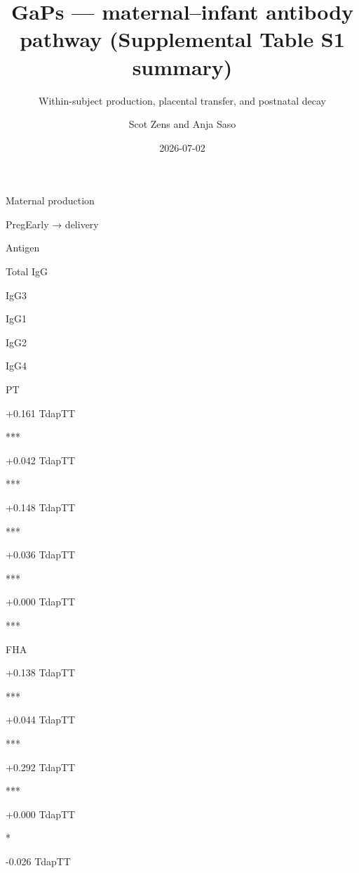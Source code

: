 \documentclass[
]{article}
\title{GaPs --- maternal--infant antibody pathway (Supplemental Table S1
summary)}
\subtitle{Within-subject production, placental transfer, and postnatal
decay}
\author{Scot Zens and Anja Saso}
\date{2026-07-02}
\begin{document}
\maketitle

Maternal production

{PregEarly → delivery}

Antigen

Total IgG

IgG3

IgG1

IgG2

IgG4

PT

{+0.161} {{Tdap}{TT}}

{}{}

{}{}

***

{+0.042} {{Tdap}{TT}}

{}{}

{}{}

***

{+0.148} {{Tdap}{TT}}

{}{}

{}{}

***

{+0.036} {{Tdap}{TT}}

{}{}

{}{}

***

{+0.000} {{Tdap}{TT}}

{}{}

{}{}

***

FHA

{+0.138} {{Tdap}{TT}}

{}{}

{}{}

***

{+0.044} {{Tdap}{TT}}

{}{}

{}{}

***

{+0.292} {{Tdap}{TT}}

{}{}

{}{}

***

{+0.000} {{Tdap}{TT}}

{}{}

{}{}

*

{-0.026} {{Tdap}{TT}}

{}{}
\end{document}
